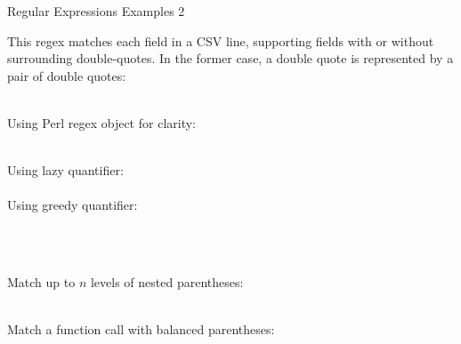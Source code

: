 \documentclass[11pt, a4paper, landscape]{scrartcl}
\newcommand{\regex}[1]{\texttt{#1}}
\begin{document}
\begin{cheatsheet}{Regular Expressions Examples 2}

\begin{col1}


This regex matches each field in a CSV line, supporting fields with or without
surrounding double-quotes. In the former case, a double quote is represented by
a pair of double quotes:\\
\regex{}\\


Using Perl regex object for clarity:\\
\regex{}\\


Using lazy quantifier:\\
\regex{}\\

Using greedy quantifier:\\
\regex{}\\

\end{col1}

\begin{col2}


\regex{}\\


\regex{}

\end{col2}

\begin{col3}


Match up to $n$ levels of nested parentheses:\\
\regex{}\\


Match a function call with balanced parentheses:\\
\regex{}\\

\end{col3}

\end{cheatsheet}
\end{document}
